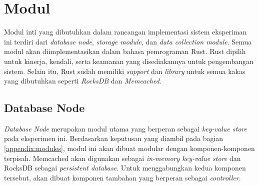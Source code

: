 \begin{table}[h]
\centering
\caption{Kebutuhan Non-Fungsional}
\end{table}

\section{Modul} 
Modul inti yang dibutuhkan dalam rancangan implementasi sistem eksperiman ini terdiri dari \textit{database node}, \textit{storage module}, dan \textit{data collection module}. Semua modul akan diimplementasikan dalam bahasa pemrograman Rust.
Rust dipilih untuk kinerja, kendali, serta keamanan yang disediakannya untuk pengembangan sistem. Selain itu, Rust sudah memiliki \textit{support} dan \textit{library} untuk semua kakas yang dibutuhkan seperti \textit{RocksDB} dan \textit{Memcached}.

\subsection{Database Node} 

\textit{Database Node} merupakan modul utama yang berperan sebagai \textit{key-value store} pada eksperimen ini. Berdasarkan keputusan yang diambil pada bagian \ref{appendix:modules}, modul ini akan dibuat modular dengan komponen-komponen terpisah. Memcached akan digunakan sebagai \textit{in-memory key-value store} dan RocksDB sebagai \textit{persistent database}. Untuk menggabungkan kedua komponen tersebut, akan dibuat komponen tambahan yang berperan sebagai \textit{controller}.

